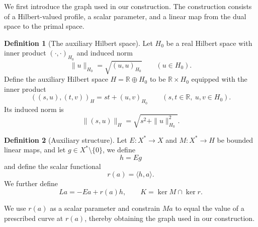 \documentclass[11pt]{article}
\newcommand{\R}{\mathbb R}
\newcommand{\pair}[2]{\langle #1,#2\rangle}
\theoremstyle{definition}
\newtheorem{definition}{Definition}
\theoremstyle{remark}
\begin{document}
We first introduce the graph used in our construction. The construction consists of a Hilbert-valued profile, a scalar parameter, and a linear map from the dual space to the primal space. 


\begin{definition}[The auxiliary Hilbert space]
\label{def:hilbert-spaces-norms}
Let $H_0$ be a real Hilbert space with inner product $(\cdot,\cdot)_{H_0}$ and induced norm
\[
\|u\|_{H_0}=\sqrt{(u,u)_{H_0}}\qquad(u\in H_0).
\]
Define the auxiliary Hilbert space $H=\R\oplus H_0$ to be $\R\times H_0$ equipped with the inner product
\[
((s,u),(t,v))_H=st+(u,v)_{H_0}
\qquad(s,t\in\R,\ u,v\in H_0).
\]
Its induced norm is
\[
\|(s,u)\|_H=\sqrt{s^2+\|u\|_{H_0}^2}.
\]
\end{definition}


\begin{definition}[Auxiliary structure]
\label{def:construction-maps}
Let $E:X^*\to X$ and $M:X^*\to H$ be bounded linear maps, and let
$g\in X^*\setminus\{0\}$, we define 
\[
h=Eg
\]
and define the scalar functional
\[
r(a)=\pair{h}{a}.
\]
We further define
\[
La=-Ea+r(a)h,
\qquad
K=\ker M\cap\ker r.
\]
\end{definition}



We use $r(a)$ as a scalar parameter and constrain $Ma$ to equal the value of a prescribed curve at $r(a)$, thereby obtaining the graph used in our construction. 
\end{document}
